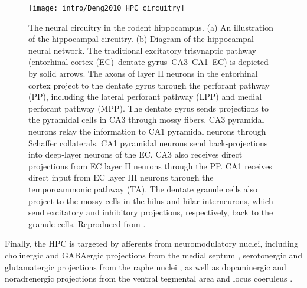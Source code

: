 \begin{figure}
	\centering
	\texttt{[image: intro/Deng2010\_HPC\_circuitry]}
	\caption[The neural circuitry in the rodent hippocampus]{The neural circuitry in the rodent hippocampus.
	(a) An illustration of the hippocampal circuitry.
	(b) Diagram of the hippocampal neural network. The traditional excitatory trisynaptic pathway (entorhinal cortex (EC)--dentate gyrus--CA3--CA1--EC) is depicted by solid arrows. The axons of layer II neurons in the entorhinal cortex project to the dentate gyrus through the perforant pathway (PP), including the lateral perforant pathway (LPP) and medial perforant pathway (MPP). The dentate gyrus sends projections to the pyramidal cells in CA3 through mossy fibers. CA3 pyramidal neurons relay the information to CA1 pyramidal neurons through Schaffer collaterals. CA1 pyramidal neurons send back-projections into deep-layer neurons of the EC. CA3 also receives direct projections from EC layer II neurons through the PP. CA1 receives direct input from EC layer III neurons through the temporoammonic pathway (TA). The dentate granule cells also project to the mossy cells in the hilus and hilar interneurons, which send excitatory and inhibitory projections, respectively, back to the granule cells. 
	Reproduced from \citet{Deng2010}.}
	\label{fig:intro:memory:HPC_circuitry}
\end{figure}


Finally, the \ac{HPC} is targeted by afferents from neuromodulatory nuclei, including cholinergic and GABAergic projections from the medial septum  \citep{Klausberger2008}, serotonergic and glutamatergic projections from the raphe nuclei \citep{Varga2009}, as well as dopaminergic and noradrenergic projections from the ventral tegmental area \citep{Gasbarri1997} and locus coeruleus \citep{Foote1983}.


